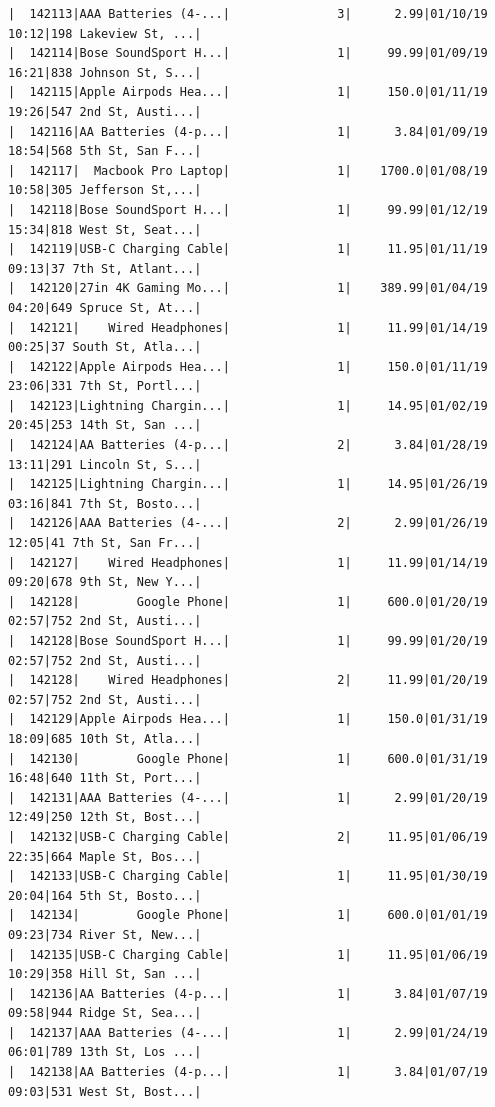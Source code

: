 \documentclass[
  letterpaper,
  DIV=11,
  numbers=noendperiod]{scrartcl}
\begin{document}
\begin{verbatim}
|  142113|AAA Batteries (4-...|               3|      2.99|01/10/19 10:12|198 Lakeview St, ...|
|  142114|Bose SoundSport H...|               1|     99.99|01/09/19 16:21|838 Johnson St, S...|
|  142115|Apple Airpods Hea...|               1|     150.0|01/11/19 19:26|547 2nd St, Austi...|
|  142116|AA Batteries (4-p...|               1|      3.84|01/09/19 18:54|568 5th St, San F...|
|  142117|  Macbook Pro Laptop|               1|    1700.0|01/08/19 10:58|305 Jefferson St,...|
|  142118|Bose SoundSport H...|               1|     99.99|01/12/19 15:34|818 West St, Seat...|
|  142119|USB-C Charging Cable|               1|     11.95|01/11/19 09:13|37 7th St, Atlant...|
|  142120|27in 4K Gaming Mo...|               1|    389.99|01/04/19 04:20|649 Spruce St, At...|
|  142121|    Wired Headphones|               1|     11.99|01/14/19 00:25|37 South St, Atla...|
|  142122|Apple Airpods Hea...|               1|     150.0|01/11/19 23:06|331 7th St, Portl...|
|  142123|Lightning Chargin...|               1|     14.95|01/02/19 20:45|253 14th St, San ...|
|  142124|AA Batteries (4-p...|               2|      3.84|01/28/19 13:11|291 Lincoln St, S...|
|  142125|Lightning Chargin...|               1|     14.95|01/26/19 03:16|841 7th St, Bosto...|
|  142126|AAA Batteries (4-...|               2|      2.99|01/26/19 12:05|41 7th St, San Fr...|
|  142127|    Wired Headphones|               1|     11.99|01/14/19 09:20|678 9th St, New Y...|
|  142128|        Google Phone|               1|     600.0|01/20/19 02:57|752 2nd St, Austi...|
|  142128|Bose SoundSport H...|               1|     99.99|01/20/19 02:57|752 2nd St, Austi...|
|  142128|    Wired Headphones|               2|     11.99|01/20/19 02:57|752 2nd St, Austi...|
|  142129|Apple Airpods Hea...|               1|     150.0|01/31/19 18:09|685 10th St, Atla...|
|  142130|        Google Phone|               1|     600.0|01/31/19 16:48|640 11th St, Port...|
|  142131|AAA Batteries (4-...|               1|      2.99|01/20/19 12:49|250 12th St, Bost...|
|  142132|USB-C Charging Cable|               2|     11.95|01/06/19 22:35|664 Maple St, Bos...|
|  142133|USB-C Charging Cable|               1|     11.95|01/30/19 20:04|164 5th St, Bosto...|
|  142134|        Google Phone|               1|     600.0|01/01/19 09:23|734 River St, New...|
|  142135|USB-C Charging Cable|               1|     11.95|01/06/19 10:29|358 Hill St, San ...|
|  142136|AA Batteries (4-p...|               1|      3.84|01/07/19 09:58|944 Ridge St, Sea...|
|  142137|AAA Batteries (4-...|               1|      2.99|01/24/19 06:01|789 13th St, Los ...|
|  142138|AA Batteries (4-p...|               1|      3.84|01/07/19 09:03|531 West St, Bost...|

\end{verbatim}
\end{document}
